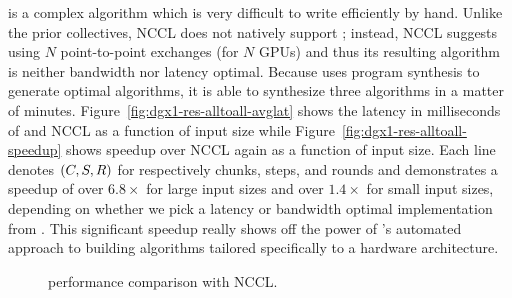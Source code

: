 \alltoall is a complex algorithm which is very difficult to write
efficiently by hand. Unlike the prior collectives, NCCL does not
natively support \alltoall; instead, NCCL suggests using $N$
point-to-point exchanges (for $N$ GPUs) and thus its resulting
algorithm is neither bandwidth nor latency optimal.  Because \tool{}
uses program synthesis to generate optimal algorithms, it is able to
synthesize three \alltoall{} algorithms in a matter of minutes.
Figure~\ref{fig:dgx1-res-alltoall-avglat} shows the latency in
milliseconds of \tool{} and NCCL as a function of input size while
Figure~\ref{fig:dgx1-res-alltoall-speedup} shows speedup over NCCL
again as a function of input size.  Each line denotes $(C,
S, R)$ for respectively chunks, steps, and rounds and
demonstrates a speedup of over $6.8\times$ for large input sizes and
over $1.4\times$ for small input sizes, depending on whether we pick a
latency or bandwidth optimal implementation from \tool.  This
significant speedup really shows off the power of \tool's automated
approach to building algorithms tailored specifically to a hardware
architecture.

\begin{figure}[tbp]
  \centering
  \hfill
  \caption{\alltoall performance comparison with NCCL.}
  \label{fig:dgx1-res-alltoall}
\end{figure}

